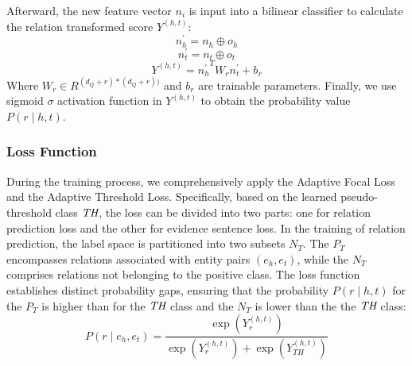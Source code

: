\documentclass[preprint,12pt]{elsarticle}
\begin{document}
Afterward, the new feature vector  $n_i$ is input into a bilinear classifier to calculate the relation transformed score $Y^{(h,t)}$:
\begin{equation}
n_{h}^{'} = n_{h} \oplus o_{h}
\label{eq16}
\end{equation}
\begin{equation}
n_{t}^{'} = n_{t} \oplus o_{t}
\label{eq17}
\end{equation}
\begin{equation}
Y^{({h,t})} = {n_{h}^{'}}^{T}W_{r}n_{t}^{'} + b_{r}
\label{eq18}
\end{equation}
Where $W_r\in R^{(d_Q+r)*(d_Q+r))}$ and $b_r$ are trainable parameters. Finally, we use sigmoid $\sigma$ activation function in $Y^{(h,t)}$ to obtain the probability value $P\left( r \middle| {h,t} \right)$.

\subsubsection{Loss Function}\label{subsubsec4}
During the training process, we comprehensively apply the Adaptive Focal Loss\cite{tan-etal-2022-document}  and  the Adaptive Threshold Loss. Specifically, based on the learned pseudo-threshold class $\emph{TH}$, the loss can be divided into two parts: one for relation prediction loss and the other for evidence sentence loss. In the training of relation prediction, the label space is partitioned into two subsets $N_T$. The $P_T$ encompasses relations associated with entity pairs $(e_h,e_t)$, while the $N_T$  comprises relations not belonging to the positive class. The loss function establishes distinct probability gaps, ensuring that the probability $P\left( r \middle| {h,t} \right)$ for the  $P_T$  is higher than for the  $\emph{TH}$ class and the $N_T$  is lower than the the $\emph{TH}$ class:
\begin{equation}
P\left( {r \mid e_{h},e_{t}} \right) = \frac{\exp\left( Y_{r}^{({h,t})} \right)}{{\exp\left( Y_{r}^{({h,t})} \right)} + {\exp\left( Y_{TH}^{({h,t})} \right)}}
\label{eq19}
\end{equation}
\end{document}
